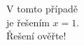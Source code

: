 \documentclass[preview]{standalone}
\begin{document}
\begin{center}
V tomto případě\\ je řešením $x=1$.\\ Řešení ověřte!
\end{center}
\end{document}
